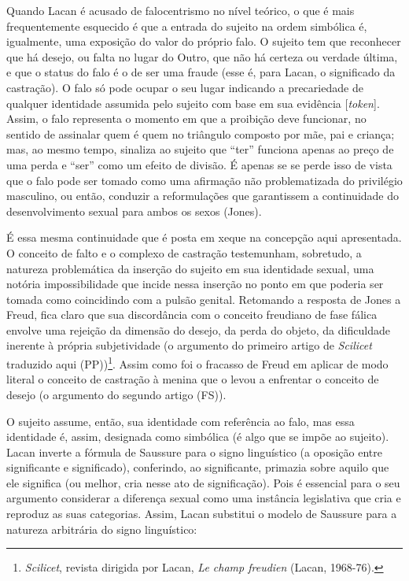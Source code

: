 Quando Lacan é acusado de falocentrismo no nível teórico, o que é mais
frequentemente esquecido é que a entrada do sujeito na ordem simbólica
é, igualmente, uma exposição do valor do próprio falo. O sujeito tem que
reconhecer que há desejo, ou falta no lugar do Outro, que não há certeza
ou verdade última, e que o status do falo é o de ser uma fraude (esse é,
para Lacan, o significado da castração). O falo só pode ocupar o seu
lugar indicando a precariedade de qualquer identidade assumida pelo
sujeito com base em sua evidência {[}\emph{token}{]}. Assim, o falo
representa o momento em que a proibição deve funcionar, no sentido de
assinalar quem é quem no triângulo composto por mãe, pai e criança; mas,
ao mesmo tempo, sinaliza ao sujeito que ``ter'' funciona apenas ao preço
de uma perda e ``ser'' como um efeito de divisão. É apenas se se perde
isso de vista que o falo pode ser tomado como uma afirmação não
problematizada do privilégio masculino, ou então, conduzir a
reformulações que garantissem a continuidade do desenvolvimento sexual
para ambos os sexos (Jones).

É essa mesma continuidade que é posta em xeque na concepção aqui
apresentada. O conceito de falto e o complexo de castração testemunham,
sobretudo, a natureza problemática da inserção do sujeito em sua
identidade sexual, uma notória impossibilidade que incide nessa inserção
no ponto em que poderia ser tomada como coincidindo com a pulsão
genital. Retomando a resposta de Jones a Freud, fica claro que sua
discordância com o conceito freudiano de fase fálica envolve uma
rejeição da dimensão do desejo, da perda do objeto, da dificuldade
inerente à própria subjetividade (o argumento do primeiro artigo de
\emph{Scilicet} traduzido aqui (PP))\footnote{\emph{Scilicet}, revista
  dirigida por Lacan, \emph{Le champ freudien} (Lacan, 1968-76).}. Assim
como foi o fracasso de Freud em aplicar de modo literal o conceito de
castração à menina que o levou a enfrentar o conceito de desejo (o
argumento do segundo artigo (FS)).

O sujeito assume, então, sua identidade com referência ao falo, mas essa
identidade é, assim, designada como simbólica (é algo que se impõe ao
sujeito). Lacan inverte a fórmula de Saussure para o signo linguístico
(a oposição entre significante e significado), conferindo, ao
significante, primazia sobre aquilo que ele significa (ou melhor, cria
nesse ato de significação). Pois é essencial para o seu argumento
considerar a diferença sexual como uma instância legislativa que cria e
reproduz as suas categorias. Assim, Lacan substitui o modelo de Saussure
para a natureza arbitrária do signo linguístico:

